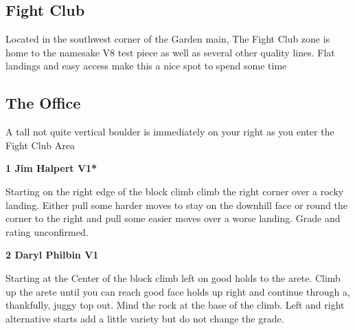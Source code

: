 \begin{multicols}{2}
		\section{Fight Club}\label{sa:Fight Club}
	\begin{minipage}{\columnwidth}
	Located in the southwest corner of the Garden main, The Fight Club zone is home to the namesake V8 test piece as well as several other quality lines. Flat landings and easy access make this a nice spot to spend some time
	\end{minipage}

			\subsection*{The Office}\label{bf:The Office}
			\begin{minipage}{\columnwidth}
			A tall not quite vertical boulder is immediately on your right as you enter the Fight Club Area
			\end{minipage}
			
					\begin{minipage}{\linewidth}	
					\label{rt:Jim Halpert}
\colorbox{green!20}{
\parbox{0.95\textwidth}{
\textbf{
1 Jim Halpert V1*  \warn \warn 
}
}
}

					\begin{adjustwidth}{0.5cm}{}				
					Starting on the right edge of the block climb climb the right corner over a rocky landing. Either pull some harder moves to stay on the downhill face or round the corner to the right and pull some easier moves over a worse landing. Grade and rating unconfirmed.
					\end{adjustwidth}
					\end{minipage}

					\begin{minipage}{\linewidth}	
					\label{rt:Daryl Philbin}
\colorbox{green!20}{
\parbox{0.95\textwidth}{
\textbf{
2 Daryl Philbin V1     \warn 
}
}
}

					\begin{adjustwidth}{0.5cm}{}				
					Starting at the Center of the block climb left on good holds to the arete. Climb up the arete until you can reach good face holds up right and continue through a, thankfully, juggy top out. Mind the rock at the base of the climb. Left and right alternative starts add a little variety but do not change the grade.
					\end{adjustwidth}
					\end{minipage}

\end{multicols}
